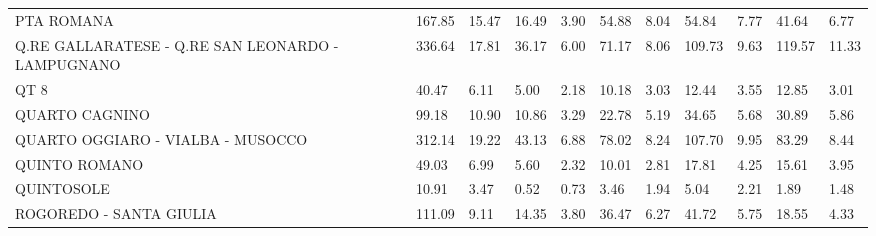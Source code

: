 \begin{table}[H]
{{\begin{tabular}{lp{1.3cm}p{1.3cm}p{1.3cm}p{1.3cm}p{1.3cm}p{1.3cm}p{1.3cm}p{1.3cm}p{1.3cm}p{1.3cm}}
PTA ROMANA                                         &                    167.85 &                 15.47 &                       16.49 &                    3.90 &                       54.88 &                    8.04 &                       54.84 &                    7.77 &                     41.64 &                  6.77 \\
Q.RE GALLARATESE - Q.RE SAN LEONARDO - LAMPUGNANO  &                    336.64 &                 17.81 &                       36.17 &                    6.00 &                       71.17 &                    8.06 &                      109.73 &                    9.63 &                    119.57 &                 11.33 \\
QT 8                                               &                     40.47 &                  6.11 &                        5.00 &                    2.18 &                       10.18 &                    3.03 &                       12.44 &                    3.55 &                     12.85 &                  3.01 \\
QUARTO CAGNINO                                     &                     99.18 &                 10.90 &                       10.86 &                    3.29 &                       22.78 &                    5.19 &                       34.65 &                    5.68 &                     30.89 &                  5.86 \\
QUARTO OGGIARO - VIALBA - MUSOCCO                  &                    312.14 &                 19.22 &                       43.13 &                    6.88 &                       78.02 &                    8.24 &                      107.70 &                    9.95 &                     83.29 &                  8.44 \\
QUINTO ROMANO                                      &                     49.03 &                  6.99 &                        5.60 &                    2.32 &                       10.01 &                    2.81 &                       17.81 &                    4.25 &                     15.61 &                  3.95 \\
QUINTOSOLE                                         &                     10.91 &                  3.47 &                        0.52 &                    0.73 &                        3.46 &                    1.94 &                        5.04 &                    2.21 &                      1.89 &                  1.48 \\
ROGOREDO - SANTA GIULIA                            &                    111.09 &                  9.11 &                       14.35 &                    3.80 &                       36.47 &                    6.27 &                       41.72 &                    5.75 &                     18.55 &                  4.33 \\

\end{tabular}}}
\end{table}
